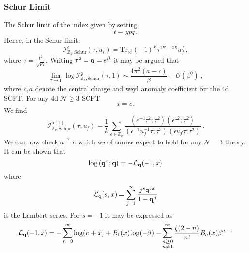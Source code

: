 \documentclass[main.tex]{subfiles}
\begin{document}
\subsubsection{Schur Limit}
The Schur limit of the index given by setting \cite{Gadde:2011uv}
\begin{equation}
t=ypq\,.
\end{equation}
Hence, in the Schur limit:
\begin{equation}
\mathcal{I}^{\mathfrak{g}}_{\mathbb{Z}_k,\text{Schur}}(\tau,u_f)=\textrm{Tr}_{\mathbb{S}^3}(-1)^F\tau^{2E-2R}u_f^f\,,
\end{equation}
where $\tau=\frac{t^2}{\sqrt{pq}}$.
Writing $\tau^2=\mathbf{q}=e^{\beta}$ it may be argued that \cite{Beem:2017ooy,Ardehali:2015bla,Buican:2015ina,DiPietro:2014bca}
\begin{equation}\label{eqn:schurloglimit}
\lim_{\tau\to1}\log \mathcal{I}^{\mathfrak{g}}_{\mathbb{Z}_k,\text{Schur}}(\tau,1)\sim\frac{4\pi^2(a-c)}{\beta}+\mathcal{O}(\beta^0)\,,
\end{equation} 
where $c,a$ denote the central charge and weyl anomaly coefficient for the 4d SCFT. For any 4d $\mathcal{N}\geq3$ SCFT \cite{Aharony:2015oyb}
\begin{equation}
a=c\,.
\end{equation}
We find
\begin{equation}\label{eqn:u1schur}
\mathcal{I}^{\mathfrak{u}(1)}_{\mathbb{Z}_k,\text{Schur}}(\tau,u_f)=\frac{1}{k}\sum_{\epsilon\in\mathbb{Z}_k}\frac{\left(\epsilon^{-1}\tau^2;\tau^2\right)\left(\epsilon\tau^2;\tau^2\right)}{\left(\epsilon^{-1}u_f^{-1}\tau;\tau^2\right)\left(\epsilon u_f \tau;\tau^2\right)}\,.
\end{equation}
We can now check $a\stackrel{?}{=}c$ which we of course expect to hold for any $\mathcal{N}=3$ theory. It can be shown that
\begin{equation}
\log\left(\mathbf{q}^x;\mathbf{q}\right)=-\mathcal{L}_{\mathbf{q}}(-1,x)
\end{equation}
where
\begin{equation}\label{eqn:Pochammer}
\mathcal{L}_{\mathbf{q}}(s,x)=\sum_{j=1}^{\infty}\frac{j^s\mathbf{q}^{jx}}{1-\mathbf{q}^j}
\end{equation}
is the Lambert series.
For $s=-1$ it may be expressed as \cite{2016arXiv160201085B}
\begin{equation}
\mathcal{L}_{\mathbf{q}}(-1,x)=-\sum_{n=0}^{\infty}\log(n+x)+B_1(x)\log(-\beta)-\sum_{\substack{n\geq0\\n\neq1}}^{\infty}\frac{\zeta(2-n)}{n!}B_n(x)\beta^{n-1}
\end{equation}
\end{document}
